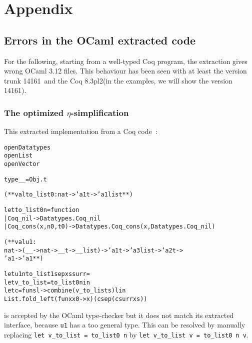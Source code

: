 \documentclass[a4paper, 11pt]{article}
\newenvironment{ml}
  {%
   \begin{alltt}
   \footnotesize} %% 3.12.0
  {\end{alltt} %
  }
\newcommand{\ocaml}{OCaml 3.12\xspace}
\newcommand{\coqc}{Coq 8.3pl2\xspace}
\newcommand{\coqv}{14161}
\begin{document}



\newpage
\appendix
\section{Appendix}
\subsection{Errors in the OCaml extracted code}
For the following, starting from a well-typed Coq program, the extraction gives wrong \ocaml files. This behaviour has been seen with at least the version trunk \coqv~and the \coqc (in the examples, we will show the version \coqv).
\subsubsection{The optimized $\eta$-simplification}
\label{s:appendix_eta}
This extracted implementation from a Coq code~:
\begin{ml}
open Datatypes
open List
open Vector

type __ = Obj.t

(** val to_list0 : nat -> 'a1 t -> 'a1 list **)

let to_list0 n = function
| Coq_nil -> Datatypes.Coq_nil
| Coq_cons (x, n0, t0) -> Datatypes.Coq_cons (x, Datatypes.Coq_nil)

(** val u1 :
    nat -> (__ -> nat -> __ t -> __ list) -> 'a1 t -> 'a3 list -> 'a2 t ->
    'a1 -> 'a1 **)

let u1 n to_list1 sep xs surr =
  let v_to_list = to_list0 n in
  let c = fun s l -> combine (v_to_list s) l in
  List.fold_left (fun x x0 -> x) (c sep (c surr xs))
\end{ml}
is accepted by the OCaml type-checker but it does not match its extracted interface, because \verb|u1| has a too general type. This can be resolved by manually replacing \verb|let v_to_list = to_list0 n| by \verb|let v_to_list v = to_list0 n v|.
\end{document}
